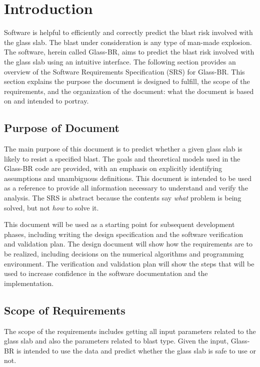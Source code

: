 \documentclass[12pt]{article}
\newcommand{\progname}{Glass-BR}
\begin{document}
\section{Introduction}

Software is helpful to efficiently and correctly predict the blast risk involved
with the glass slab. The blast under consideration is any type of man-made
explosion. The software, herein called \progname, aims to predict the blast risk
involved with the glass slab using an intuitive interface.  The following
section provides an overview of the Software Requirements Specification (SRS)
for \progname.  This section explains the purpose the document is designed to
fulfill, the scope of the requirements, and the organization of the document: what
the document is based on and intended to portray.

\subsection{Purpose of Document}

The main purpose of this document is to predict whether a given glass slab is
likely to resist a specified blast.  The goals and theoretical models used in
the \progname{} code are provided, with an emphasis on explicitly identifying
assumptions and unambiguous definitions.  This document is intended to be used
as a reference to provide all information necessary to understand and verify the
analysis.  The SRS is abstract because the contents say \emph{what} problem is
being solved, but not \emph{how} to solve it.

This document will be used as a starting point for subsequent development
phases, including writing the design specification and the software verification
and validation plan.  The design document will show how the requirements are to
be realized, including decisions on the numerical algorithms and programming
environment.  The verification and validation plan will show the steps that will
be used to increase confidence in the software documentation and the
implementation.


\subsection{Scope of Requirements} 

The scope of the requirements includes getting all input parameters related to
the glass slab and also the parameters related to blast type. Given the input,
\progname{} is intended to use the data and predict whether the glass slab is
safe to use or not.
\end{document}
